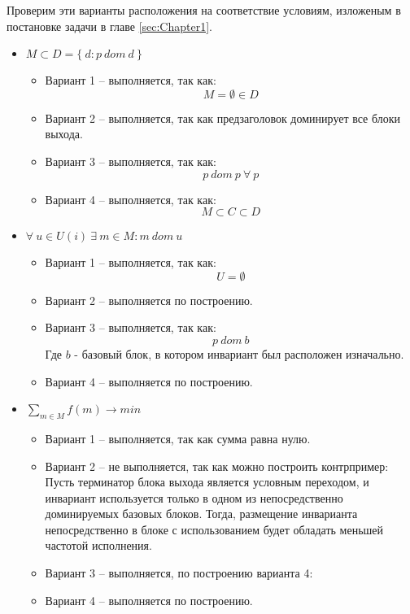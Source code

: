 Проверим эти варианты расположения на соответствие условиям, изложеным в постановке задачи в главе \ref{sec:Chapter1}.

\begin{itemize}
    \item $M \subset D = \{ \: d : p \: dom \: d \: \}$
        \begin{itemize}
            \item Вариант 1 -- выполняется, так как:
                $$ M = \emptyset \in D $$
            \item Вариант 2 -- выполняется, так как предзаголовок доминирует все блоки выхода.
            \item Вариант 3 -- выполняется, так как:
                $$ p \: dom \: p \: \forall \: p $$
            \item Вариант 4 -- выполняется, так как:
                $$M \subset C \subset D$$
        \end{itemize}
    \item $\forall \: u \in U(i) \: \exists \: m \in M : m \: dom \: u $
        \begin{itemize}
            \item Вариант 1 -- выполняется, так как:
                $$ U = \emptyset $$
            \item Вариант 2 -- выполняется по построению.
            \item Вариант 3 -- выполняется, так как:
                $$ p \: dom \: b $$
                Где $b$ - базовый блок, в котором инвариант был расположен изначально.
            \item Вариант 4 -- выполняется по построению.
        \end{itemize}
    \item $\sum_{m \in M}{f(m)} \to min $
        \begin{itemize}
            \item Вариант 1 -- выполняется, так как сумма равна нулю.
            \item Вариант 2 -- не выполняется, так как можно построить контрпример:
                Пусть терминатор блока выхода является условным переходом, и инвариант используется только в одном из непосредственно доминируемых базовых блоков.
                Тогда, размещение инварианта непосредственно в блоке с использованием будет обладать меньшей частотой исполнения.
            \item Вариант 3 -- выполняется, по построению варианта 4:
            \item Вариант 4 -- выполняется по построению.
        \end{itemize}
\end{itemize}

